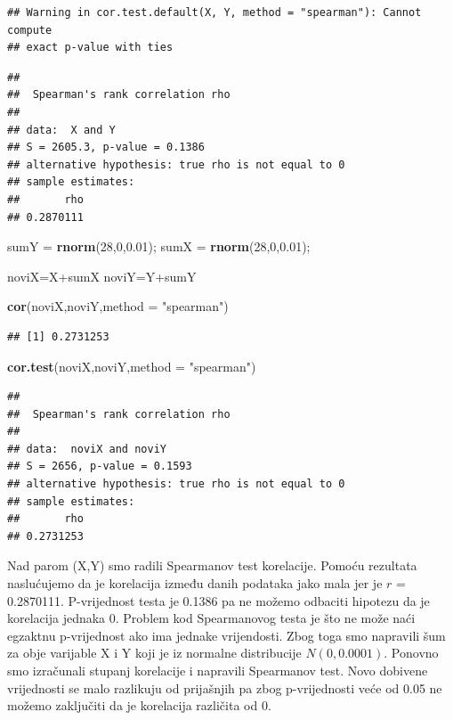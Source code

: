 \documentclass[]{article}
\newenvironment{Shaded}{\begin{snugshade}}{\end{snugshade}}
\newcommand{\KeywordTok}[1]{\textcolor[rgb]{0.13,0.29,0.53}{\textbf{{#1}}}}
\newcommand{\DataTypeTok}[1]{\textcolor[rgb]{0.13,0.29,0.53}{{#1}}}
\newcommand{\DecValTok}[1]{\textcolor[rgb]{0.00,0.00,0.81}{{#1}}}
\newcommand{\FloatTok}[1]{\textcolor[rgb]{0.00,0.00,0.81}{{#1}}}
\newcommand{\StringTok}[1]{\textcolor[rgb]{0.31,0.60,0.02}{{#1}}}
\newcommand{\NormalTok}[1]{{#1}}
\begin{document}
\begin{verbatim}
## Warning in cor.test.default(X, Y, method = "spearman"): Cannot compute
## exact p-value with ties
\end{verbatim}

\begin{verbatim}
## 
##  Spearman's rank correlation rho
## 
## data:  X and Y
## S = 2605.3, p-value = 0.1386
## alternative hypothesis: true rho is not equal to 0
## sample estimates:
##       rho 
## 0.2870111
\end{verbatim}

\begin{Shaded}
\begin{Highlighting}[]
\NormalTok{sumY =}\StringTok{ }\KeywordTok{rnorm}\NormalTok{(}\DecValTok{28}\NormalTok{,}\DecValTok{0}\NormalTok{,}\FloatTok{0.01}\NormalTok{);}
\NormalTok{sumX =}\StringTok{ }\KeywordTok{rnorm}\NormalTok{(}\DecValTok{28}\NormalTok{,}\DecValTok{0}\NormalTok{,}\FloatTok{0.01}\NormalTok{);}

\NormalTok{noviX=X+sumX}
\NormalTok{noviY=Y+sumY}

\KeywordTok{cor}\NormalTok{(noviX,noviY,}\DataTypeTok{method =} \StringTok{"spearman"}\NormalTok{)}
\end{Highlighting}
\end{Shaded}

\begin{verbatim}
## [1] 0.2731253
\end{verbatim}

\begin{Shaded}
\begin{Highlighting}[]
\KeywordTok{cor.test}\NormalTok{(noviX,noviY,}\DataTypeTok{method =} \StringTok{"spearman"}\NormalTok{)}
\end{Highlighting}
\end{Shaded}

\begin{verbatim}
## 
##  Spearman's rank correlation rho
## 
## data:  noviX and noviY
## S = 2656, p-value = 0.1593
## alternative hypothesis: true rho is not equal to 0
## sample estimates:
##       rho 
## 0.2731253
\end{verbatim}

Nad parom (X,Y) smo radili Spearmanov test korelacije. Pomoću rezultata
naslućujemo da je korelacija između danih podataka jako mala jer je
\(r\) = 0.2870111. P-vrijednost testa je 0.1386 pa ne možemo odbaciti
hipotezu da je korelacija jednaka 0. Problem kod Spearmanovog testa je
što ne može naći egzaktnu p-vrijednost ako ima jednake vrijendosti. Zbog
toga smo napravili šum za obje varijable X i Y koji je iz normalne
distribucije \(N (0, 0.0001)\). Ponovno smo izračunali stupanj
korelacije i napravili Spearmanov test. Novo dobivene vrijednosti se
malo razlikuju od prijašnjih pa zbog p-vrijednosti veće od 0.05 ne
možemo zaključiti da je korelacija različita od 0.
\end{document}
